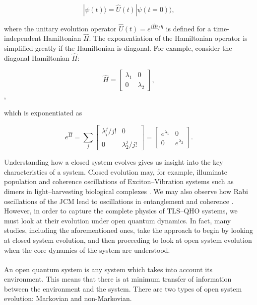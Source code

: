 \documentclass[11pt]{article}
\begin{document}
\begin{equation} \label{eqn:closed_evo}
    |\psi(t)\rangle = \hat{U}(t)|\psi(t=0)\rangle,
\end{equation}

where the unitary evolution operator $\hat{U}(t) = e^{i\hat{H}t/\hbar}$ is defined for a time-independent Hamiltonian $\hat{H}$. The exponentiation of the Hamiltonian operator is simplified greatly if the Hamiltonian is diagonal. For example, consider the diagonal Hamiltonian $\hat{H}$:

\begin{equation*}
    \hat{H} = 
    \begin{bmatrix}
        \lambda_1 & 0 \\
        0 & \lambda_2
    \end{bmatrix},
\end{equation*}, 

which is exponentiated as

\begin{equation*}
    e^{\hat{H}} = \sum_j 
    \begin{bmatrix}
        \lambda_i^j/j! & 0 \\
        0 & \lambda_2^j/j!
    \end{bmatrix}
    = \begin{bmatrix}
        e^{\lambda_1} & 0 \\
        0 & e^{\lambda_2}
    \end{bmatrix}.
\end{equation*}

Understanding how a closed system evolves gives us insight into the key characteristics of a system. Closed evolution may, for example, illuminate population and coherence oscillations of Exciton--Vibration systems such as dimers in light--harvesting biological complexes \cite{ExVib2014-Alexandra}. We may also observe how Rabi oscillations of the JCM lead to oscillations in entanglement and coherence \cite{Entanglement2009-REE_VNapplied}. However, in order to capture the complete physics of TLS--QHO systems, we must look at their evolution under open quantum dynamics. In fact, many studies, including the aforementioned ones, take the approach to begin by looking at closed system evolution, and then proceeding to look at open system evolution when the core dynamics of the system are understood.\\
\\
An open quantum system is any system which takes into account its environment. This means that there is at minimum transfer of information between the environment and the system. There are two types of open system evolution: Markovian and non-Markovian.
\end{document}
